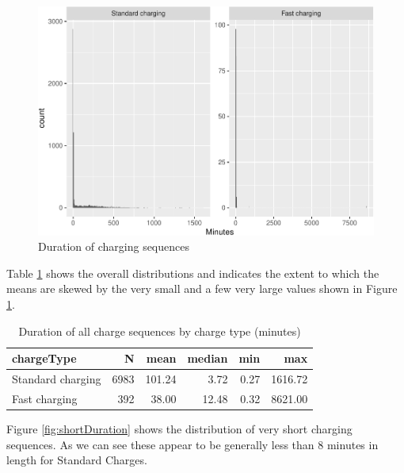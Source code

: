 \documentclass[]{article}
\begin{document}
\begin{figure}
\centering
\includegraphics{EVBB_report_files/figure-latex/durationHist-1.pdf}
\caption{\label{fig:durationHist}Duration of charging sequences}
\end{figure}

Table \ref{tab:durationDescTable} shows the overall distributions and
indicates the extent to which the means are skewed by the very small and
a few very large values shown in Figure \ref{fig:durationHist}.

\begin{table}[t]

\caption{\label{tab:durationDescTable}Duration of all charge sequences by charge type (minutes)}
\centering
\begin{tabular}{l|r|r|r|r|r}
\hline
chargeType & N & mean & median & min & max\\
\hline
Standard charging & 6983 & 101.24 & 3.72 & 0.27 & 1616.72\\
\hline
Fast charging & 392 & 38.00 & 12.48 & 0.32 & 8621.00\\
\hline
\end{tabular}
\end{table}

Figure \ref{fig:shortDuration} shows the distribution of very short
charging sequences. As we can see these appear to be generally less than
8 minutes in length for Standard Charges.
\end{document}
